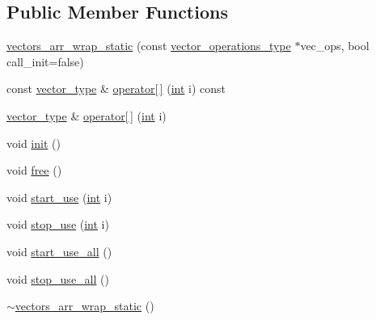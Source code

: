 \subsection*{Public Member Functions}
\begin{DoxyCompactItemize}
\item 
\hyperlink{structnumerical__algos_1_1detail_1_1vectors__arr__wrap__static_a0a9c2f99487deb5f49f25ca0b8159f38}{vectors\-\_\-arr\-\_\-wrap\-\_\-static} (const \hyperlink{structnumerical__algos_1_1detail_1_1vectors__arr__wrap__static_a4de11cdce0c015a0b78f2171fd8680c0}{vector\-\_\-operations\-\_\-type} $\ast$vec\-\_\-ops, bool call\-\_\-init=false)
\item 
const \hyperlink{structnumerical__algos_1_1detail_1_1vectors__arr__wrap__static_ae21a4b4f6af2d7a042e02f41234c1ea0}{vector\-\_\-type} \& \hyperlink{structnumerical__algos_1_1detail_1_1vectors__arr__wrap__static_a547c1456be9ea68bcea91b488e39849e}{operator\mbox{[}$\,$\mbox{]}} (\hyperlink{classint}{int} i) const 
\item 
\hyperlink{structnumerical__algos_1_1detail_1_1vectors__arr__wrap__static_ae21a4b4f6af2d7a042e02f41234c1ea0}{vector\-\_\-type} \& \hyperlink{structnumerical__algos_1_1detail_1_1vectors__arr__wrap__static_a4c177dec9d6558636391963bb368c5b2}{operator\mbox{[}$\,$\mbox{]}} (\hyperlink{classint}{int} i)
\item 
void \hyperlink{structnumerical__algos_1_1detail_1_1vectors__arr__wrap__static_a1af0a665796dbb297eea9e0ff7ca4962}{init} ()
\item 
void \hyperlink{structnumerical__algos_1_1detail_1_1vectors__arr__wrap__static_a378e43cf950c8fe739494c314d071cb0}{free} ()
\item 
void \hyperlink{structnumerical__algos_1_1detail_1_1vectors__arr__wrap__static_a197582a3c0ce0bbf9802b9239aee298b}{start\-\_\-use} (\hyperlink{classint}{int} i)
\item 
void \hyperlink{structnumerical__algos_1_1detail_1_1vectors__arr__wrap__static_aa574c3dbd3984fe296855a4e3a6e0219}{stop\-\_\-use} (\hyperlink{classint}{int} i)
\item 
void \hyperlink{structnumerical__algos_1_1detail_1_1vectors__arr__wrap__static_a56191f67f80bd6731d8b20bf7106d6a2}{start\-\_\-use\-\_\-all} ()
\item 
void \hyperlink{structnumerical__algos_1_1detail_1_1vectors__arr__wrap__static_ad7a112dc89d38e4132a01eb600ea91d8}{stop\-\_\-use\-\_\-all} ()
\item 
\hyperlink{structnumerical__algos_1_1detail_1_1vectors__arr__wrap__static_a3a83460b68bdedde965f134ae2309715}{$\sim$vectors\-\_\-arr\-\_\-wrap\-\_\-static} ()
\end{DoxyCompactItemize}
